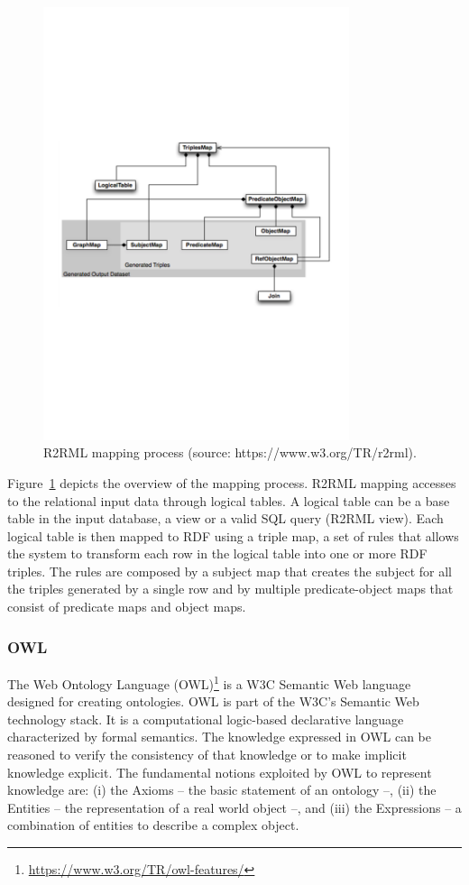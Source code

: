 \begin{figure}[t]
  \begin{center}
    \includegraphics[width=0.8\textwidth]{img/R2RML}
    \caption{R2RML mapping process (source: https://www.w3.org/TR/r2rml).}
    \label{fig:r2rml}
  \end{center}
\end{figure}

Figure~\ref{fig:r2rml} depicts the overview of the mapping process.
R2RML mapping accesses to the relational input data through logical tables. A logical table can be a base table in the input database, a view or a valid SQL query (R2RML view).
Each logical table is then mapped to RDF using a triple map, a set of rules that allows the system to transform each row in the logical table into one or more RDF triples. The rules are composed by a subject map that creates the subject for all the triples generated by a single row and by multiple predicate-object maps that consist of predicate maps and object maps.

\subsubsection{OWL} \label{sec:owl}
The Web Ontology Language (OWL)\footnote{\url{https://www.w3.org/TR/owl-features/}} is a W3C Semantic Web language designed for creating ontologies.
OWL is part of the W3C's Semantic Web technology stack. It is a computational logic-based declarative language  characterized by formal semantics.
The knowledge expressed in OWL can be reasoned to verify the consistency of that knowledge or to make implicit knowledge explicit.
The fundamental notions exploited by OWL to represent knowledge are: (i) the Axioms -- the basic statement of an ontology --, (ii) the Entities -- the representation of a real world object --, and (iii) the Expressions -- a combination of entities to describe a complex object.

